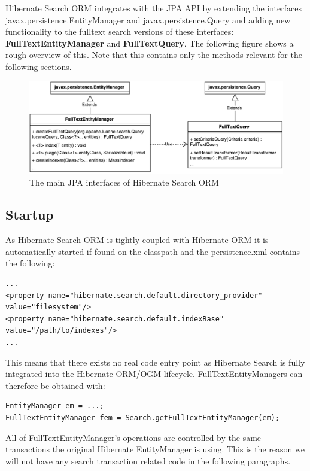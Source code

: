 Hibernate Search ORM integrates with the JPA API by extending the interfaces  javax.persistence.EntityManager and javax.persistence.Query and adding new functionality to the fulltext search versions of these interfaces: \textbf{FullTextEntityManager} and \textbf{FullTextQuery}. The following figure shows a rough overview of this. Note that this contains only the methods relevant for the following sections.
\\
\begin{figure}[ht]
	\centering
	\includegraphics[scale=0.6]{images/hibernate_search_jpa_integration_original.pdf}
	\caption{The main JPA interfaces of Hibernate Search ORM}
	\label{hibernate_search_jpa_integration_original}
\end{figure}

\pagebreak

\subsection{Startup}
As Hibernate Search ORM is tightly coupled with Hibernate ORM it is automatically started if found on the classpath and the persistence.xml contains the following:
\\
\lstset{language=java, breaklines=true}
\begin{lstlisting}[frame=htrbl, caption={Additions to persistence.xml with Hibernate Search ORM}, label={lst:hibernate_search_persistence.xml}]
...
<property name="hibernate.search.default.directory_provider" value="filesystem"/>
<property name="hibernate.search.default.indexBase" value="/path/to/indexes"/>
...
\end{lstlisting}
\noindent
This means that there exists no real code entry point as Hibernate Search is fully integrated into the Hibernate ORM/OGM lifecycle. FullTextEntityManagers can therefore be obtained with:
\\
\lstset{language=java}
\begin{lstlisting}[frame=htrbl, caption={Obtaining a FullTextEntityManager with Hibernate Search ORM}, label={lst:indexing_object_hsearch_orm_jpa.java}]
EntityManager em = ...;
FullTextEntityManager fem = Search.getFullTextEntityManager(em);
\end{lstlisting}
All of FullTextEntityManager's operations are controlled by the same transactions the original Hibernate EntityManager is using. This is the reason we will not have any search transaction related code in the following paragraphs.

